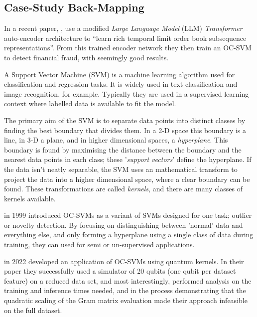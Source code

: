 


\subsection{Case-Study Back-Mapping}

In a recent paper, , \citeauthor{Poutre:2024} \cite{Poutre:2024} use a modified 
\emph{Large Language Model} (LLM) \emph{Transformer} auto-encoder architecture to 
\enquote{learn rich temporal limit order book subsequence representations}.  
From this trained encoder network they then train an OC-SVM to detect financial fraud, with seemingly good results.

A Support Vector Machine (SVM) is a machine learning algorithm used for classification and regression tasks.  
It is widely used in text classification and image recognition, for example.
Typically they are used in a supervised learning context where labelled data is available to fit the model.

The primary aim of the SVM is to separate data points into distinct classes by finding the best boundary that divides them.
In a 2-D space this boundary is a line, in 3-D a plane, and in higher dimensional spaces, a \emph{hyperplane}.
This boundary is found by maximising the distance between the boundary and the nearest data points in each class;
these '\emph{support vectors}' define the hyperplane. 
If the data isn't neatly separable, 
the SVM uses an mathematical transform to project the data into a higher dimensional space, 
where a clear boundary can be found.
These transformations are called \emph{kernels}, and there are many classes of kernels available.

\citeauthor{Scholkopf:1999} in 1999 \cite{Scholkopf:1999} introduced OC-SVMs as a variant of SVMs designed for one task;
outlier or novelty detection.
By focusing on distinguishing between 'normal' data and everything else, 
and only forming a hyperplane using a single class of data during training, 
they can used for semi or un-supervised applications.

\citeauthor{Kyriienko:2022} \cite{Kyriienko:2022} in 2022 developed an application of OC-SVMs using quantum kernels.
In their paper they successfully used a simulator of 20 qubits (one qubit per dataset feature)
on a reduced data set, and most interestingly, performed analysis on the training and inference times needed, 
and in the process demonstrating that the quadratic scaling of the Gram matrix evaluation 
made their approach infeasible on the full dataset.

